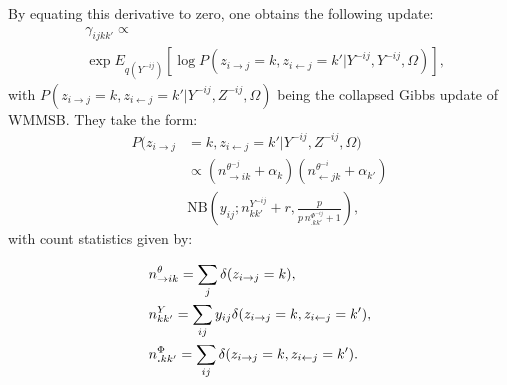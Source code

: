 %
By equating this derivative to zero, one obtains the following update:
\begin{align} \label{eq:maximization}
&\gamma_{ijkk'} \propto \nonumber\\
&\exp E_{q({Y}^{-ij})} [\log P(z_{i\rightarrow j}=k, z_{i\leftarrow j}=k' | {Y}^{-ij}, {Y}^{-ij}, \Omega)],
\end{align}
%
with  $P(z_{i\rightarrow j}=k, z_{i\leftarrow j}=k' | {Y}^{-ij}, {Z}^{-ij}, \Omega)$ being the collapsed Gibbs update of WMMSB. They take the form:
%
\begin{align*}
P(z_{i\rightarrow j} & = k, z_{i\leftarrow j}=k' |{Y}^{-ij}, {Z}^{-ij}, \Omega) \\
& \propto (n_{\rightarrow ik}^{\theta^{-j}} + \alpha_k) (n_{\leftarrow jk}^{\theta^{-i}} + \alpha_{k'}) \\
& \mathrm{NB}\left(y_{ij}; n^{{Y}^{-ij}}_{kk'} + r, \frac{p}{p\,n^{\Phi^{-ij}}_{\bm{.}kk'} + 1} \right),
\end{align*}
%
with count statistics given by:


\begin{align*}                                                                                                                                        
&n^{\theta}_{\rightarrow ik} = \sum_j \delta(z_{i\rightarrow j}=k), \\
&n^{{Y}}_{kk'} = \sum_{ij} y_{ij}\delta(z_{i\rightarrow j}=k, z_{i\leftarrow j}=k'), \\
&n^{\Phi}_{\bm{.}kk'} = \sum_{ij} \delta( z_{i\rightarrow j}=k, z_{i\leftarrow j}=k').
\end{align*}   

